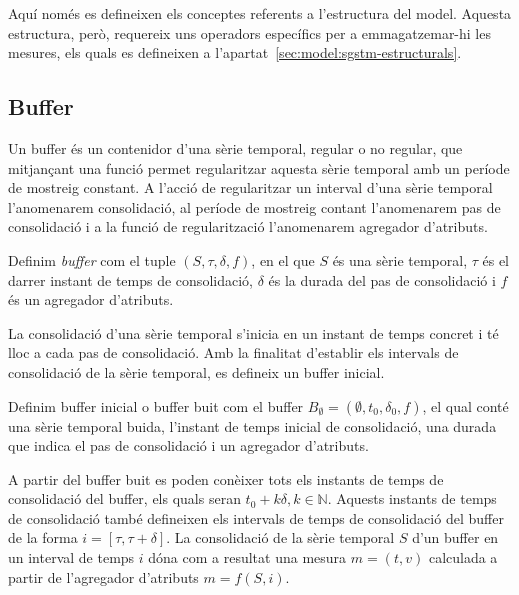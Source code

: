 Aquí només es defineixen els conceptes referents a l'estructura del
model. Aquesta estructura, però, requereix uns operadors específics
per a emmagatzemar-hi les mesures, els quals es defineixen a
l'apartat~\ref{sec:model:sgstm-estructurals}.




\subsection{Buffer}\label{sec:model:buffer}

Un buffer és un contenidor d'una sèrie temporal, regular o no regular, que mitjançant una funció permet regularitzar aquesta sèrie temporal amb un període de mostreig constant. A l'acció de regularitzar un interval d'una sèrie temporal l'anomenarem consolidació, al període de mostreig contant l'anomenarem pas de consolidació i a la funció de regularització l'anomenarem agregador d'atributs.

\begin{definition}[Buffer]
  Definim \emph{buffer} com el tuple $(S,\tau,\delta,f)$, en el que
  $S$ és una sèrie temporal, $\tau$ és el darrer instant de temps de
  consolidació, $\delta$ és la durada del pas de consolidació i $f$ és
  un agregador d'atributs.
\end{definition}

La consolidació d'una sèrie temporal s'inicia en un instant de temps
concret i té lloc a cada pas de consolidació. Amb la finalitat
d'establir els intervals de consolidació de la sèrie temporal, es
defineix un buffer inicial.

\begin{definition}\label{def:model:buffer_buit}
  Definim buffer inicial o buffer buit com el buffer $B_{\emptyset} =
  (\emptyset,t_0, \delta_0, f)$, el qual
  conté una sèrie temporal buida, l'instant de temps inicial de
  consolidació, una durada que indica el pas de consolidació i un
  agregador d'atributs.
\end{definition}

A partir del buffer buit es poden conèixer tots els instants de temps
de consolidació del buffer, els quals seran $t_0+k\delta,
k\in\mathbb{N}$. Aquests instants de temps de consolidació també
defineixen els intervals de temps de consolidació del buffer de la
forma $i=[\tau,\tau+\delta]$. La consolidació de la sèrie temporal $S$
d'un buffer en un interval de temps $i$ dóna com a resultat una
mesura $m=(t,v)$ calculada a partir de l'agregador d'atributs $m = f
(S, i)$.








